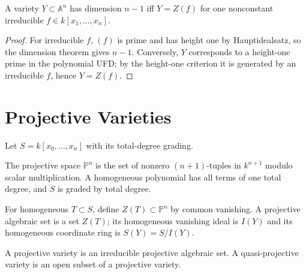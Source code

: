 \begin{proposition}
\label{prop:ha-ch1-1-13}
A variety $Y\subset\mathbb A^n$ has dimension $n-1$ iff $Y=Z(f)$ for one nonconstant irreducible
$f\in k[x_1,\ldots,x_n]$.
\end{proposition}
\begin{proof}
For irreducible $f$, $(f)$ is prime and has height one by Hauptidealsatz, so the dimension theorem
gives $n-1$.  Conversely, $Y$ corresponds to a height-one prime in the polynomial UFD; by the
height-one criterion it is generated by an irreducible $f$, hence $Y=Z(f)$.
\end{proof}

\section{Projective Varieties}

Let $S=k[x_0,\ldots,x_n]$ with its total-degree grading.

\begin{definition}
\label{def:ha-ch1-projective-space}
The projective space $\mathbb P^n$ is the set of nonzero $(n+1)$-tuples in $k^{n+1}$ modulo
scalar multiplication. A homogeneous polynomial has all terms of one total degree, and $S$ is
graded by total degree.
\end{definition}

\begin{definition}
\label{def:ha-ch1-projective-algebraic-set}
For homogeneous $T\subset S$, define $Z(T)\subset\mathbb P^n$ by common vanishing. A projective
algebraic set is a set $Z(T)$; its homogeneous vanishing ideal is $I(Y)$ and its homogeneous
coordinate ring is $S(Y)=S/I(Y)$.
\end{definition}

\begin{definition}
\label{def:ha-ch1-projective-variety}
A projective variety is an irreducible projective algebraic set. A quasi-projective variety is an
open subset of a projective variety.
\end{definition}

